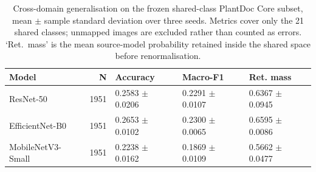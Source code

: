 \begin{table}[htbp]
\caption{Cross-domain generalisation on the frozen shared-class PlantDoc Core subset, mean $\pm$ sample standard deviation over three seeds. Metrics cover only the 21 shared classes; unmapped images are excluded rather than counted as errors. `Ret.\ mass' is the mean source-model probability retained inside the shared space before renormalisation.}
\label{tab:cross-domain-compact}
\footnotesize
\centering
\begin{tabular}{lrlll}
\toprule
Model & N & Accuracy & Macro-F1 & Ret. mass \\
\midrule
ResNet-50 & 1951 & 0.2583 $\pm$ 0.0206 & 0.2291 $\pm$ 0.0107 & 0.6367 $\pm$ 0.0945 \\
EfficientNet-B0 & 1951 & 0.2653 $\pm$ 0.0102 & 0.2300 $\pm$ 0.0065 & 0.6595 $\pm$ 0.0086 \\
MobileNetV3-Small & 1951 & 0.2238 $\pm$ 0.0162 & 0.1869 $\pm$ 0.0109 & 0.5662 $\pm$ 0.0477 \\
\bottomrule
\end{tabular}
\end{table}

